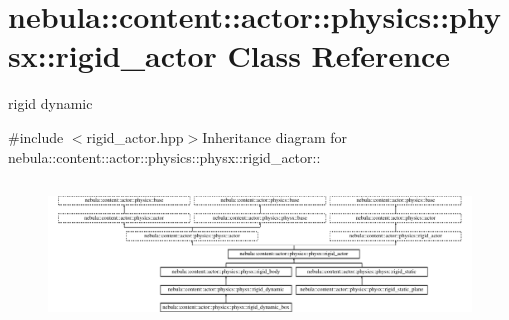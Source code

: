 \hypertarget{classnebula_1_1content_1_1actor_1_1physics_1_1physx_1_1rigid__actor}{
\section{nebula::content::actor::physics::physx::rigid\_\-actor Class Reference}
\label{classnebula_1_1content_1_1actor_1_1physics_1_1physx_1_1rigid__actor}
}


rigid dynamic  


{\ttfamily \#include $<$rigid\_\-actor.hpp$>$}Inheritance diagram for nebula::content::actor::physics::physx::rigid\_\-actor::\begin{figure}[H]
\begin{center}
\leavevmode
\includegraphics[height=3.84314cm]{classnebula_1_1content_1_1actor_1_1physics_1_1physx_1_1rigid__actor}
\end{center}
\end{figure}
